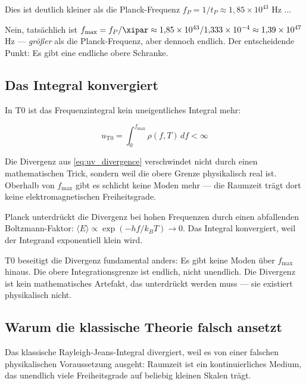 Dies ist deutlich kleiner als die Planck-Frequenz 
$f_P = 1/t_P \approx 1{,}85 \times 10^{43}$ Hz ... 

Nein, tatsächlich ist $f_{\max} = f_P / \xipar \approx 1{,}85 \times 10^{43} / 1{,}333 \times 10^{-4} 
\approx 1{,}39 \times 10^{47}$ Hz — \emph{größer} als die Planck-Frequenz, aber dennoch 
endlich. Der entscheidende Punkt: Es gibt eine endliche obere Schranke.

\subsection{Das Integral konvergiert}

In T0 ist das Frequenzintegral kein uneigentliches Integral mehr:

\begin{equation}
    u_{\text{T0}} = \int_0^{f_{\max}} \rho(f, T) \, df < \infty
    \label{eq:t0_convergent_integral}
\end{equation}

Die Divergenz aus \eqref{eq:uv_divergence} verschwindet nicht durch einen 
mathematischen Trick, sondern weil die obere Grenze physikalisch real ist. 
Oberhalb von $f_{\max}$ gibt es schlicht keine Moden mehr — die Raumzeit trägt 
dort keine elektromagnetischen Freiheitsgrade.

\begin{important}
    Planck unterdrückt die Divergenz bei hohen Frequenzen durch einen abfallenden 
    Boltzmann-Faktor: $\langle E \rangle \propto \exp(-hf/k_BT) \to 0$. 
    Das Integral konvergiert, weil der Integrand exponentiell klein wird.
    
    T0 beseitigt die Divergenz fundamental anders: Es gibt keine Moden über 
    $f_{\max}$ hinaus. Die obere Integrationsgrenze ist endlich, nicht unendlich. 
    Die Divergenz ist kein mathematisches Artefakt, das unterdrückt werden muss — 
    sie existiert physikalisch nicht.
\end{important}

\subsection{Warum die klassische Theorie falsch ansetzt}

Das klassische Rayleigh-Jeans-Integral divergiert, weil es von einer falschen 
physikalischen Voraussetzung ausgeht: Raumzeit ist ein kontinuierliches Medium, das 
unendlich viele Freiheitsgrade auf beliebig kleinen Skalen trägt.

